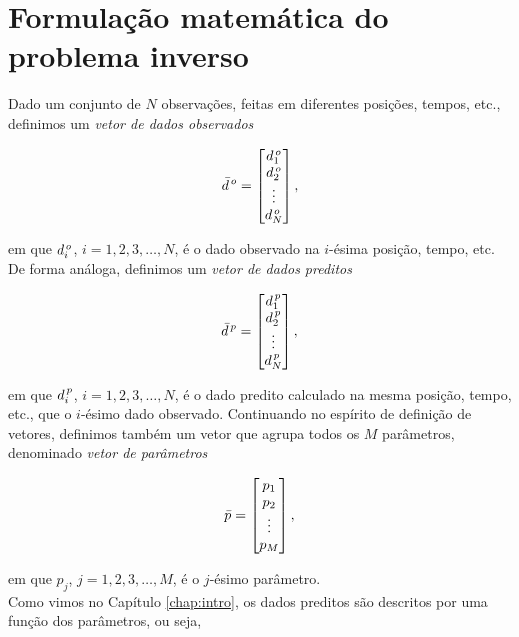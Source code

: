 \chapter{Formulação matemática do problema inverso}

Dado um conjunto de $N$ observações, feitas em diferentes posições, tempos, etc.,
de\-fi\-ni\-mos um {\it vetor de dados observados}

\begin{equation}
\bar{d}^{\thinspace o} =
    \begin{bmatrix}
    d_1^{\thinspace o} \\
    d_2^{\thinspace o} \\
    \vdots \\
    d_N^{\thinspace o}
    \end{bmatrix},
\end{equation}

\noindent em que $d_i^{\thinspace o}$, $i = 1, 2, 3, \dotsc, N$, é o dado
observado na $i$-ésima posição, tempo, etc.
De forma análoga, definimos um {\it vetor de dados preditos}

\begin{equation}
\bar{d}^{\thinspace p} =
    \begin{bmatrix}
    d_1^{\thinspace p} \\
    d_2^{\thinspace p} \\
    \vdots \\
    d_N^{\thinspace p}
    \end{bmatrix},
\end{equation}

\noindent em que $d_i^{\thinspace p}$, $i = 1, 2, 3, \dotsc, N$, é o dado predito
calculado na mesma posição, tempo, etc., que o $i$-ésimo dado observado.
Continuando no espírito de definição de vetores, definimos também um vetor que
agrupa todos os $M$ parâmetros, denominado {\it vetor de parâmetros}

\begin{equation}
\bar{p} =
    \begin{bmatrix}
    p_1 \\
    p_2 \\
    \vdots \\
    p_M
    \end{bmatrix},
\label{eq:param_vect}
\end{equation}

\noindent em que $p_j$, $j = 1, 2, 3, \dotsc, M$, é o $j$-ésimo parâmetro.
\\
\indent Como vimos no Capítulo \ref{chap:intro}, os dados preditos são descritos
por uma função dos parâmetros, ou seja,

